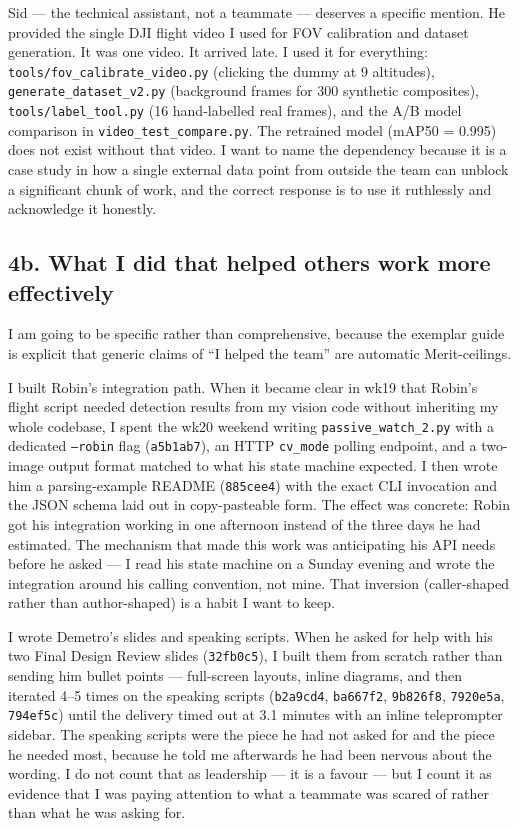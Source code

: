 Sid --- the technical assistant, not a teammate --- deserves a specific mention. He provided the single DJI flight video I used for FOV calibration and dataset generation. It was one video. It arrived late. I used it for everything: \texttt{tools/fov\_calibrate\_video.py} (clicking the dummy at 9 altitudes), \texttt{generate\_dataset\_v2.py} (background frames for 300 synthetic composites), \texttt{tools/label\_tool.py} (16 hand-labelled real frames), and the A/B model comparison in \texttt{video\_test\_compare.py}. The retrained model (mAP50 = 0.995) does not exist without that video. I want to name the dependency because it is a case study in how a single external data point from outside the team can unblock a significant chunk of work, and the correct response is to use it ruthlessly and acknowledge it honestly.

\subsection*{4b. What I did that helped others work more effectively}

I am going to be specific rather than comprehensive, because the exemplar guide is explicit that generic claims of ``I helped the team'' are automatic Merit-ceilings.

I built Robin's integration path. When it became clear in wk19 that Robin's flight script needed detection results from my vision code without inheriting my whole codebase, I spent the wk20 weekend writing \texttt{passive\_watch\_2.py} with a dedicated \texttt{--robin} flag (\texttt{a5b1ab7}), an HTTP \texttt{cv\_mode} polling endpoint, and a two-image output format matched to what his state machine expected. I then wrote him a parsing-example README (\texttt{885cee4}) with the exact CLI invocation and the JSON schema laid out in copy-pasteable form. The effect was concrete: Robin got his integration working in one afternoon instead of the three days he had estimated. The mechanism that made this work was anticipating his API needs before he asked --- I read his state machine on a Sunday evening and wrote the integration around his calling convention, not mine. That inversion (caller-shaped rather than author-shaped) is a habit I want to keep.

I wrote Demetro's slides and speaking scripts. When he asked for help with his two Final Design Review slides (\texttt{32fb0c5}), I built them from scratch rather than sending him bullet points --- full-screen layouts, inline diagrams, and then iterated 4--5 times on the speaking scripts (\texttt{b2a9cd4}, \texttt{ba667f2}, \texttt{9b826f8}, \texttt{7920e5a}, \texttt{794ef5c}) until the delivery timed out at 3.1 minutes with an inline teleprompter sidebar. The speaking scripts were the piece he had not asked for and the piece he needed most, because he told me afterwards he had been nervous about the wording. I do not count that as leadership --- it is a favour --- but I count it as evidence that I was paying attention to what a teammate was scared of rather than what he was asking for.

